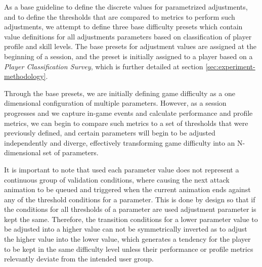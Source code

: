 

As a base guideline to define the discrete values for parametrized adjustments, and to define the thresholds that are compared to metrics to perform such adjustments, we attempt to define three base difficulty presets which contain value definitions for all adjustments parameters based on classification of player profile and skill levels. The base presets for adjustment values are assigned at the beginning of a session, and the preset is initially assigned to a player based on a \emph{Player Classification Survey}, which is further detailed at section \ref{sec:experiment-methodology}.

Through the base presets, we are initially defining game difficulty as a one dimensional configuration of multiple parameters. However, as a session progresses and we capture in-game events and calculate performance and profile metrics, we can begin to compare such metrics to a set of thresholds that were previously defined, and certain parameters will begin to be adjusted independently and diverge, effectively transforming game difficulty into an N-dimensional set of parameters.

It is important to note that used each parameter value does not represent a continuous group of validation conditions, where causing the next attack animation to be queued and triggered when the current animation ends against any of the threshold conditions for a parameter. This is done by design so that if the conditions for all thresholds of a parameter are used adjustment parameter is kept the same. Therefore, the transition conditions for a lower parameter value to be adjusted into a higher value can not be symmetrically inverted as to adjust the higher value into the lower value, which generates a tendency for the player to be kept in the same difficulty level unless their performance or profile metrics relevantly deviate from the intended user group.

